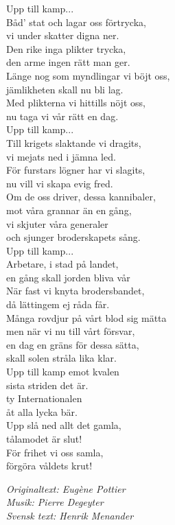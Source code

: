 \documentclass[a6paper,10pt]{article}
\begin{document}
Upp till kamp... \\
\newline
Båd' stat och lagar oss förtrycka, \\
vi under skatter digna ner. \\
Den rike inga plikter trycka, \\
den arme ingen rätt man ger. \\
Länge nog som myndlingar vi böjt oss, \\
jämlikheten skall nu bli lag. \\
Med plikterna vi hittills nöjt oss, \\
nu taga vi vår rätt en dag. \\
\newline
Upp till kamp... \\
\newline
Till krigets slaktande vi dragits, \\
vi mejats ned i jämna led. \\
För furstars lögner har vi slagits, \\
nu vill vi skapa evig fred. \\
Om de oss driver, dessa kannibaler, \\
mot våra grannar än en gång, \\
vi skjuter våra generaler \\
och sjunger broderskapets sång. \\
\newpage
\setlength{\oddsidemargin}{-0.47in}
\noindent
Upp till kamp... \\
\newline
Arbetare, i stad på landet, \\
en gång skall jorden bliva vår\\ 
När fast vi knyta brodersbandet, \\
då lättingem ej råda får. \\
Många rovdjur på vårt blod sig mätta \\
men när vi nu till vårt försvar, \\
en dag en gräns för dessa sätta,\\ 
skall solen stråla lika klar. \\
\newline
Upp till kamp emot kvalen \\
sista striden det är. \\
ty Internationalen \\
åt alla lycka bär. \\
Upp slå ned allt det gamla,\\
tålamodet är slut!\\
För frihet vi oss samla,\\
förgöra våldets krut!
\begin{flushright}
\textit{Originaltext: Eugène Pottier\\
Musik: Pierre Degeyter\\
Svensk text: Henrik Menander}
\end{flushright}
\end{document}

